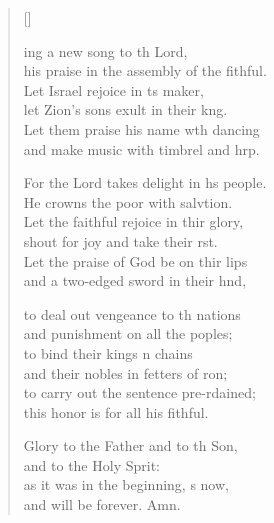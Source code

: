 \settowidth{\versewidth}{his praise in the assembly of the faithful.}
\begin{verse}[\versewidth]
  \begin{patverse}
    ing a new song to th Lord,\Med\\
his praise in the assembly of the fithful.\\
Let Israel rejoice in \pointup{\i}ts maker,\Med\\
let Zion’s sons exult in their k\pointup{\i}ng.\\
Let them praise his name w\pointup{\i}th dancing\Med\\
and make music with timbrel and hrp.

For the Lord takes delight in h\pointup{\i}s people.\Med\\
He crowns the poor with salvtion.\\
Let the faithful rejoice in thir glory,\Med\\
shout for joy and take their rst.\\
Let the praise of God be on thir lips\Med\\
and a two-edged sword in their hnd,

to deal out vengeance to th nations\Med\\
and punishment on all the poples;\\
to bind their kings \pointup{\i}n chains\Med\\
and their nobles in fetters of \pointup{\i}ron;\\
to carry out the sentence pre-rdained;\Med\\
this honor is for all his fithful.

Glory to the Father and to th Son,\Med\\
and to the Holy Sp\pointup{\i}rit:\\
as it was in the beginning, \pointup{\i}s now,\Med\\
and will be forever. Amn.
  \end{patverse}
\end{verse}
